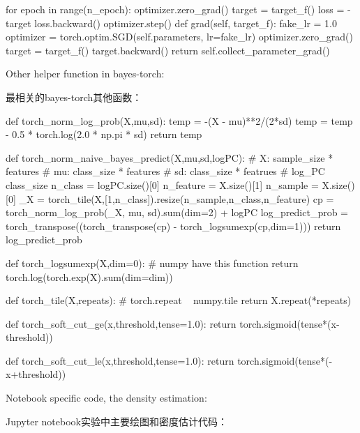 \documentclass{article}
\begin{document}
\begin{python}
        for epoch in range(n_epoch):
            optimizer.zero_grad()
            target = target_f()
            loss = -target
            loss.backward()
            optimizer.step()
    def grad(self, target_f):
        fake_lr = 1.0
        optimizer = torch.optim.SGD(self.parameters, lr=fake_lr)
        optimizer.zero_grad()
        target = target_f()
        target.backward()
        return self.collect_parameter_grad()

\end{python}

Other helper function in bayes-torch:

最相关的bayes-torch其他函数：

\begin{python}
def torch_norm_log_prob(X,mu,sd):    
    temp = -(X - mu)**2/(2*sd) 
    temp = temp - 0.5 * torch.log(2.0 * np.pi * sd)
    return temp

def torch_norm_naive_bayes_predict(X,mu,sd,logPC):
    # X: sample_size * features
    # mu: class_size * features
    # sd: class_size * featrues
    # log_PC class_size
    n_class = logPC.size()[0]
    n_feature = X.size()[1]
    n_sample = X.size()[0]
    _X = torch_tile(X,[1,n_class]).resize(n_sample,n_class,n_feature)
    cp = torch_norm_log_prob(_X, mu, sd).sum(dim=2) + logPC  
    log_predict_prob = torch_transpose((torch_transpose(cp) - torch_logsumexp(cp,dim=1)))
    return log_predict_prob
    
def torch_logsumexp(X,dim=0):
    # numpy have this function
    return torch.log(torch.exp(X).sum(dim=dim))

def torch_tile(X,repeats):
    # torch.repeat ~ numpy.tile
    return X.repeat(*repeats)


def torch_soft_cut_ge(x,threshold,tense=1.0):
    return torch.sigmoid(tense*(x-threshold))

def torch_soft_cut_le(x,threshold,tense=1.0):
    return torch.sigmoid(tense*(-x+threshold))


\end{python}

Notebook specific code, the density estimation:

Jupyter notebook实验中主要绘图和密度估计代码：
\end{document}
